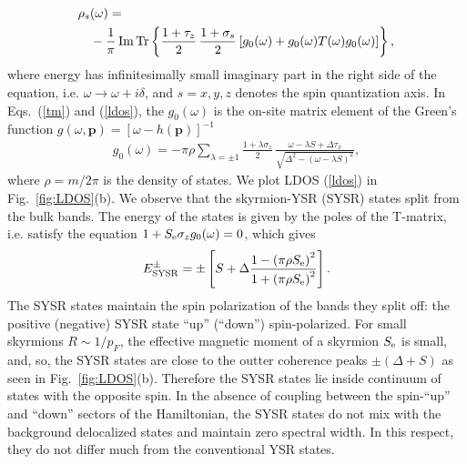 \documentclass[twocolumn,showpacs,floatfix,nofootinbib,longbibliography]{revtex4-1}
\begin{document}
\begin{align}
	\rho_s & (\omega) = \label{ldos} \\ 
	&-\frac{1}{\pi}\,{\rm Im}{\rm \,Tr} \left\{  \frac{1+\tau_z}{2}\,\frac{1+\sigma_s}{2} \left[g_0(\omega)+g_0(\omega) T(\omega) g_0(\omega)  \right]\right\},\nonumber 
 \end{align}
 where energy has infinitesimally small imaginary part in the right side of the equation, i.e. $\omega\rightarrow \omega+i\delta$, and $s=x,y,z$ denotes the spin quantization axis. In Eqs.~(\ref{tm}) and (\ref{ldos}), the $g_0(\omega)$ is the on-site matrix element of the Green's function $g(\omega,\bm p) = [\omega-h(\bm p)]^{-1}$ 
 \begin{align}
	 g_{0}(\omega)  =-\pi\rho\sum_{\lambda = \pm 1} \frac{1+\lambda\sigma_z}{2}\,\frac{\omega-\lambda S+\Delta\tau_x}{\sqrt{\Delta^2-\left( \omega-\lambda S \right)^2}},  \label{grf}
\end{align}
where $\rho = m/2\pi$ is the density of states. We plot LDOS (\ref{ldos}) in Fig.~\ref{fig:LDOS}(b). We observe that the skyrmion-YSR (SYSR) states split from the bulk bands. The energy of the states is given by the poles of the T-matrix, i.e. satisfy the equation $1+S_{\rm e}\sigma_zg_{0}(\omega)=0$, which gives 
\begin{align}
	E^\pm_{\rm SYSR} = \pm\left[S+\Delta \frac{1-\left( \pi\rho S_{\rm e} \right)^2}{1+\left( \pi\rho S_{\rm e} \right)^2}\right].
	\label{energy}
\end{align}
 The SYSR states maintain the spin polarization of the bands they split off: the positive (negative) SYSR state ``up'' (``down'') spin-polarized. For small skyrmions $R\sim 1/p_F$, the effective magnetic moment of a skyrmion $S_{\rm e}$ is small, and, so, the SYSR states are close to the outter  coherence peaks $\pm(\Delta+S)$ as seen in Fig.~\ref{fig:LDOS}(b).  Therefore the SYSR states lie inside continuum of states with the opposite spin. In the absence of coupling between the spin-``up'' and ``down'' sectors of the Hamiltonian, the SYSR states do not mix with the background delocalized states and maintain zero spectral width. In this respect, they do not differ much from the conventional YSR states.   
\end{document}
